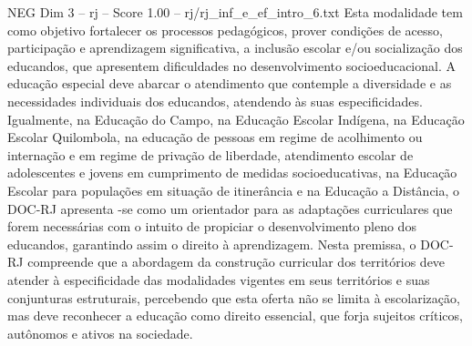 \begin{textsample}{NEG Dim 3 – rj – Score 1.00 – rj/rj\_inf\_e\_ef\_intro\_6.txt}
Esta modalidade tem como objetivo fortalecer os processos pedagógicos, prover condições de acesso, participação e aprendizagem significativa, a inclusão escolar e/ou socialização dos educandos, que apresentem dificuldades no desenvolvimento socioeducacional.
A educação especial deve abarcar o atendimento que contemple a diversidade e as necessidades individuais dos educandos, atendendo às suas especificidades.
Igualmente, na Educação do Campo, na Educação Escolar Indígena, na Educação Escolar Quilombola, na educação de pessoas em regime de acolhimento ou internação e em regime de privação de liberdade, atendimento escolar de adolescentes e jovens em cumprimento de medidas socioeducativas, na Educação Escolar para populações em situação de itinerância e na Educação a Distância, o DOC-RJ apresenta -se como um orientador para as adaptações curriculares que forem necessárias com o intuito de propiciar o desenvolvimento pleno dos educandos, garantindo assim o direito à aprendizagem.
Nesta premissa, o DOC-RJ compreende que a abordagem da construção curricular dos territórios deve atender à especificidade das modalidades vigentes em seus territórios e suas conjunturas estruturais, percebendo que esta oferta não se limita à escolarização, mas deve reconhecer a educação como direito essencial, que forja sujeitos críticos, autônomos e ativos na sociedade.

\end{textsample}
